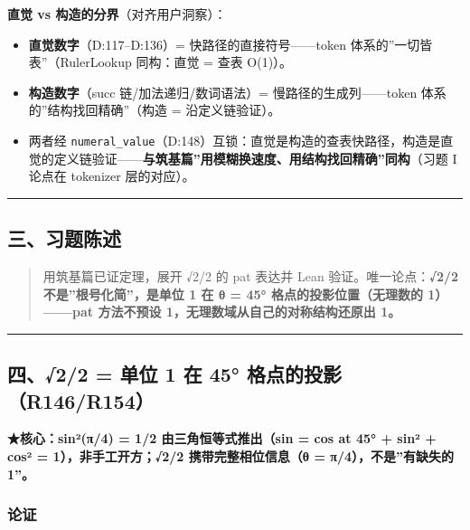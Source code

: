 \documentclass[
]{article}
\providecommand{\tightlist}{%
  \setlength{\itemsep}{0pt}\setlength{\parskip}{0pt}}
\begin{document}
\textbf{直觉 vs 构造的分界}（对齐用户洞察）：

\begin{itemize}
\tightlist
\item
  \textbf{直觉数字}（D:117--D:136）= 快路径的直接符号------token
  体系的''一切皆表''（RulerLookup 同构：直觉 = 查表 O(1)）。
\item
  \textbf{构造数字}（succ 链/加法递归/数词语法）=
  慢路径的生成列------token 体系的''结构找回精确''（构造 =
  沿定义链验证）。
\item
  两者经
  \texttt{numeral\_value}（D:148）互锁：直觉是构造的查表快路径，构造是直觉的定义链验证------\textbf{与筑基篇''用模糊换速度、用结构找回精确''同构}（习题
  I 论点在 tokenizer 层的对应）。
\end{itemize}

\begin{center}\rule{0.5\linewidth}{0.5pt}\end{center}

\subsection{三、习题陈述}\label{ux4e09ux4e60ux9898ux9648ux8ff0}

\begin{quote}
用筑基篇已证定理，展开 √2/2 的 pat 表达并 Lean
验证。唯一论点：\textbf{√2/2 不是''根号化简''，是单位 1 在 θ = 45°
格点的投影位置（无理数的 1）------pat 方法不预设
1，无理数域从自己的对称结构还原出 1。}
\end{quote}

\begin{center}\rule{0.5\linewidth}{0.5pt}\end{center}

\subsection{四、√2/2 = 单位 1 在 45°
格点的投影（R146/R154）}\label{ux56db22-ux5355ux4f4d-1-ux5728-45-ux683cux70b9ux7684ux6295ux5f71r146r154}

\textbf{★核心：sin²(π/4) = 1/2 由三角恒等式推出（sin = cos at 45° + sin²
+ cos² = 1），非手工开方；√2/2 携带完整相位信息（θ =
π/4），不是''有缺失的 1''。}

\subsubsection{论证}\label{ux8bbaux8bc1}
\end{document}
